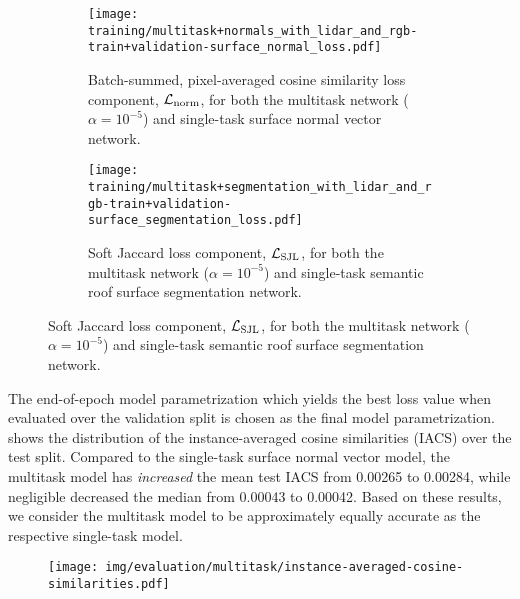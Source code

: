 \begin{figure}
  \centering
  \begin{subfigure}{\linewidth}
    \centering
    \texttt{[image: training/multitask+normals\_with\_lidar\_and\_rgb-train+validation-surface\_normal\_loss.pdf]}
    \caption{Batch-summed, pixel-averaged cosine similarity loss component, $\mathcal{L}_{\mathrm{norm}}$, for both the multitask network ($\alpha = 10^{-5}$) and single-task surface normal vector network.}
  \end{subfigure}
  \par\bigskip %
  \begin{subfigure}{\linewidth}
    \centering
    \texttt{[image: training/multitask+segmentation\_with\_lidar\_and\_rgb-train+validation-surface\_segmentation\_loss.pdf]}
    \caption{Soft Jaccard loss component, $\mathcal{L}_{\mathrm{SJL}}$, for both the multitask network ($\alpha = 10^{-5}$) and single-task semantic roof surface segmentation network.}
  \end{subfigure}
  \label{fig:full-multitask-training}
\end{figure}

The end-of-epoch model parametrization which yields the best loss value when evaluated over the validation split is chosen as the final model parametrization.
 shows the distribution of the instance-averaged cosine similarities (IACS) over the test split.
Compared to the single-task surface normal vector model, the multitask model has \emph{increased} the mean test IACS from \num{0.00265} to \num{0.00284}, while negligible decreased the median from \num{0.00043} to \num{0.00042}.
Based on these results, we consider the multitask model to be approximately equally accurate as the respective single-task model.
%
\begin{figure}
  \texttt{[image: img/evaluation/multitask/instance-averaged-cosine-similarities.pdf]}
  \label{fig:multitask-test-distribution}
\end{figure}

